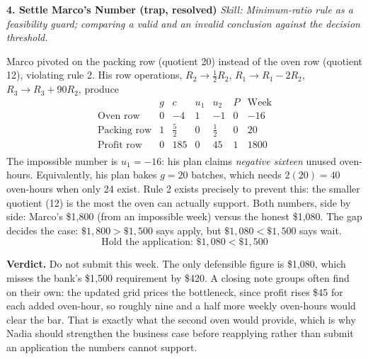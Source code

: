 \documentclass[11pt]{article}
\newcommand{\skill}[1]{{\small\textit{Skill: #1}}\par}
\begin{document}
\begin{keybox}
\medskip
\textbf{4. Settle Marco's Number (trap, resolved)}
\skill{Minimum-ratio rule as a feasibility guard; comparing a valid and an invalid conclusion against the decision threshold.}
Marco pivoted on the packing row (quotient 20) instead of the oven row (quotient 12),
violating rule 2. His row operations, $R_2 \to \tfrac{1}{2}R_2$, $R_1 \to R_1 - 2R_2$,
$R_3 \to R_3 + 90R_2$, produce
\[
\begin{array}{l|rrrrr|r}
 & g & c & u_1 & u_2 & P & \text{Week} \\
\hline
\text{Oven row} & 0 & -4 & 1 & -1 & 0 & -16 \\
\text{Packing row} & 1 & \tfrac{5}{2} & 0 & \tfrac{1}{2} & 0 & 20 \\
\text{Profit row} & 0 & 185 & 0 & 45 & 1 & 1800 \\
\end{array}
\]
The impossible number is $u_1 = -16$: his plan claims \emph{negative sixteen} unused
oven-hours. Equivalently, his plan bakes $g = 20$ batches, which needs $2(20) = 40$
oven-hours when only 24 exist. Rule 2 exists precisely to prevent this: the smaller
quotient (12) is the most the oven can actually support. Both numbers, side by side:
Marco's \$1{,}800 (from an impossible week) versus the honest \$1{,}080. The gap decides
the case: $\$1{,}800 > \$1{,}500$ says apply, but $\$1{,}080 < \$1{,}500$ says wait.
\[
\boxed{\text{Hold the application: } \$1{,}080 < \$1{,}500}
\]

\medskip
\textbf{Verdict.} Do not submit this week. The only defensible figure is \$1{,}080,
which misses the bank's \$1{,}500 requirement by \$420. A closing note groups often find
on their own: the updated grid prices the bottleneck, since profit rises \$45 for each
added oven-hour, so roughly nine and a half more weekly oven-hours would clear the bar.
That is exactly what the second oven would provide, which is why Nadia should strengthen
the business case before reapplying rather than submit an application the numbers cannot
support.
\end{keybox}
\end{document}
